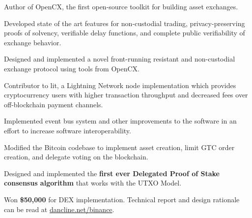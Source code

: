 
\begin{tightemize}
  \item Author of OpenCX, the first open-source toolkit for building asset exchanges.
  \item Developed state of the art features for non-custodial trading, privacy-preserving proofs of solvency, verifiable delay functions, and complete public verifiability of exchange behavior.
  \item Designed and implemented a novel front-running resistant and non-custodial exchange protocol using tools from OpenCX.
\end{tightemize}
\subsectionsep

\begin{tightemize}
  \item Contributor to lit, a Lightning Network node implementation which provides cryptocurrency users with higher transaction throughput and decreased fees over off-blockchain payment channels.
  \item Implemented event bus system and other improvements to the software in an effort to increase software interoperability.
\end{tightemize}
\subsectionsep

\begin{tightemize}
  \item Modified the Bitcoin codebase to implement asset creation, limit GTC
    order creation, and delegate voting on the blockchain.
  \item Designed and implemented the \textbf{first ever Delegated Proof of
      Stake consensus algorithm} that works with the UTXO Model.
  \item Won \textbf{\$50,000} for DEX implementation. Technical report and
    design rationale can be read at
    \href{http://dancline.net/binance/}{dancline.net/binance}.
\end{tightemize}
